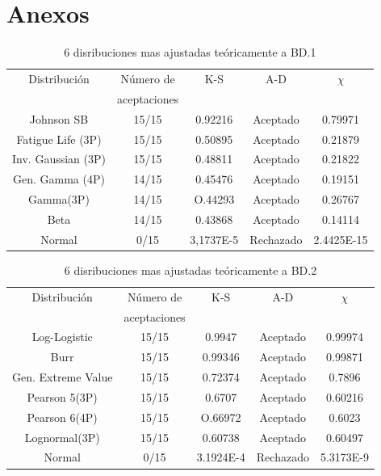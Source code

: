 \documentclass[12pt]{report}
\begin{document}
\appendix
\chapter{Anexos}
\begin{table}[h!]
	\centering
	\begin{tabular}{|c|c|c|c|c|}			
											\hline
		Distribución	  &Número de	&K-S	&A-D	& $\chi$  \\
						  &	aceptaciones &     &	 &     \\ \hline
		   Johnson SB     &    15/15    & 0.92216   & 	Aceptado     &0.79971    \\ \hline
		Fatigue Life (3P) &    15/15	& 0.50895    &  Aceptado   	& 0.21879   \\ \hline
		Inv. Gaussian (3P)&    15/15	& 0.48811  	&  Aceptado 	&   0.21822 	\\ \hline 
		Gen. Gamma (4P)   &    14/15	& 0.45476   &   Aceptado	& 0.19151   	\\ \hline
		Gamma(3P)         &   14/15	&     O.44293   &      	Aceptado   &  0.26767  	\\ \hline
		Beta              &   14/15	& 0.43868     &   	Aceptado	& 0.14114    	\\ \hline
				Normal   &   0/15	& 3,1737E-5   &   	Rechazado	& 2.4425E-15	\\ \hline  %
	\end{tabular}
	\caption{6 disribuciones mas ajustadas teóricamente a BD.1}
	\label{teo_BD1}
\end{table}


\begin{table}[h!]
	\centering
	\begin{tabular}{|c|c|c|c|c|}			
		\hline
		Distribución	  &Número de	&K-S	&A-D	& $\chi$  \\
							&	aceptaciones &     &	 &     \\ \hline
		Log-Logistic    &    15/15    & 0.9947   & 	Aceptado     &0.99974    \\ \hline
		Burr &    15/15	& 0.99346    &  Aceptado   	& 0.99871   \\ \hline
		Gen. Extreme Value &    15/15	& 0.72374  	&  Aceptado 	&   0.7896 	\\ \hline 
		Pearson 5(3P)  &    15/15	& 0.6707   &   Aceptado	& 0.60216   	\\ \hline
		Pearson 6(4P)  &   15/15	&     O.66972   &      	Aceptado   &  0.6023  	\\ \hline
		Lognormal(3P)   &   15/15	& 0.60738    &   	Aceptado	& 0.60497    	\\ \hline
		Normal   &   0/15	& 3.1924E-4   &   	Rechazado	& 5.3173E-9	\\ \hline  %
	\end{tabular}
	\caption{6 disribuciones mas ajustadas teóricamente a BD.2}
	\label{teo_BD2}
\end{table}
\end{document}
